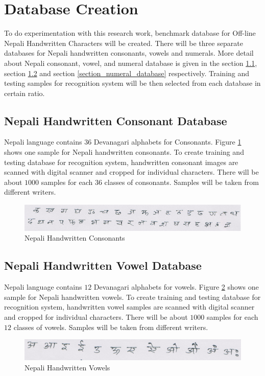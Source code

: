 \documentclass[12pt,a4paper,oneside]{article}
\numberwithin{equation}{section}
\numberwithin{algorithm}{section}
\begin{document}
	\section{Database Creation} \label{database_creation}
	
	To do experimentation with this research work, benchmark database for Off-line Nepali Handwritten Characters will be created. There will be three separate databases for Nepali handwritten consonants, vowels and numerals. More detail about Nepali consonant, vowel, and numeral database is given in the section \ref{section_consonant_database}, section \ref{section_vowel_database} and section \ref{section_numeral_database} respectively. Training and testing samples for recognition system will be then selected from each database in certain ratio.
	
	\subsection{Nepali Handwritten Consonant Database}
	\label{section_consonant_database}
	
	Nepali language contains $36$ Devanagari alphabets for Consonants. Figure \ref{figure_ka_kha} shows one sample for Nepali handwritten consonants. To create training and testing database for recognition system, handwritten consonant images are scanned with digital scanner and cropped for individual characters. There will be about $1000$ samples for each $36$ classes of consonants. Samples will be taken from different writers.
	\begin{figure}[hbtp]
	\centering
	\includegraphics[width=\linewidth]{figures/ka_kha}
	\caption{Nepali Handwritten Consonants}
	\label{figure_ka_kha}
	\end{figure}
	
	\subsection{Nepali Handwritten Vowel Database}
	\label{section_vowel_database}
	Nepali language contains $12$ Devanagari alphabets for vowels. Figure \ref{figure_a_aa} shows one sample for Nepali handwritten vowels. To create training and testing database for recognition system, handwritten vowel samples are scanned with digital scanner and cropped for individual characters. There will be about $1000$ samples for each $12$ classes of vowels. Samples will be taken from different writers.
	\begin{figure}[hbtp]
	\centering
	\includegraphics[width=\linewidth]{figures/a_aa}
	\caption{Nepali Handwritten Vowels}
	\label{figure_a_aa}
	\end{figure}
	
\end{document}
